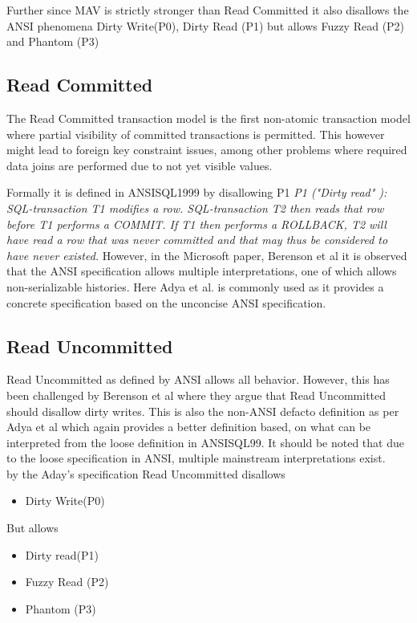 \documentclass[a4paper,10pt,titlepage]{report}
\begin{document}
    Further since MAV is strictly stronger than Read Committed it also disallows the ANSI phenomena Dirty Write(P0), Dirty Read (P1) but allows Fuzzy Read (P2) and Phantom (P3)

    \subsection{Read Committed}
    The Read Committed transaction model is the first non-atomic transaction model where partial visibility of committed transactions is permitted. This however might lead to foreign key constraint issues, among other problems where required data joins are performed due to not yet visible values.


    Formally it is defined in ANSISQL1999\cite{ansisql1999} by disallowing P1
    \textit{P1 ("Dirty read" ): SQL-transaction T1 modifies a row. SQL-transaction T2 then reads that row before T1 performs a COMMIT. If T1 then performs a ROLLBACK, T2 will have read a row that was never committed and that may thus be considered to have never existed.} However, in the Microsoft paper, Berenson et al \cite{Berensonetal} it is observed that the ANSI specification allows multiple interpretations, one of which allows non-serializable histories. Here Adya et al.\cite{Adya99weakconsistency} is commonly used as it provides a concrete specification based on the unconcise ANSI specification.



    \subsection{Read Uncommitted}
    Read Uncommitted as defined by ANSI allows all behavior. However, this has been challenged by Berenson et al\cite{Berensonetal} where they argue that Read Uncommitted should disallow dirty writes. This is also the non-ANSI defacto definition as per Adya et al \cite{Adya99weakconsistency} which again provides a better definition based, on what can be interpreted from the loose definition in ANSISQL99\cite{ansisql1999}. It should be noted that due to the loose specification in ANSI, multiple mainstream interpretations exist.\\

    by the Aday's specification Read Uncommitted disallows
    \begin{itemize}
        \item Dirty Write(P0)
    \end{itemize}
    But allows
    \begin{itemize}
        \item Dirty read(P1)
        \item Fuzzy Read (P2)
        \item Phantom (P3)
    \end{itemize}
\end{document}

